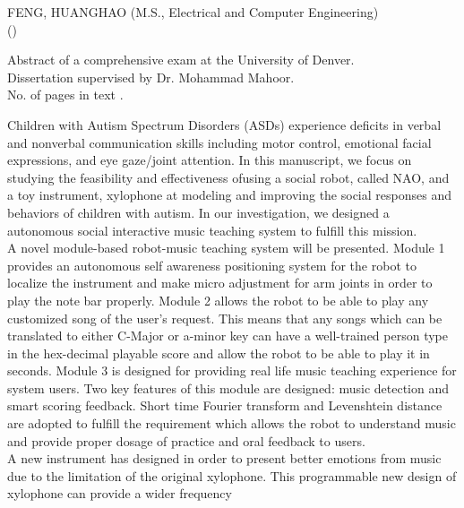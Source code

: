 \newpage
\pagestyle{empty}
\renewcommand{\baselinestretch}{1}
\begin{flushleft}
\small {
FENG, HUANGHAO  \hfill (M.S., Electrical and Computer Engineering)\\
\underline{} \hfill (\mydate)\\
\underline{}}

\vspace{0.25in}
Abstract of a comprehensive exam at the University of Denver.\\
\vspace{0.25in}
Dissertation supervised by Dr. Mohammad Mahoor.\\
No. of pages in text \underline{\pageref{LastPage}}.
\end{flushleft}
\renewcommand{\baselinestretch}{2}
\normalsize{Children with Autism Spectrum Disorders (ASDs) experience deficits in verbal and
	nonverbal communication skills including motor control, emotional facial expressions, and
	eye gaze/joint attention. In this manuscript, we focus on studying the feasibility and 
	effectiveness ofusing a social robot, called NAO, and a toy instrument, xylophone at 
	modeling and improving the social responses and	behaviors of children with autism. 
	In our investigation, we designed a autonomous social interactive music teaching 
	system to fulfill this mission. \\
	A novel module-based robot-music teaching system will be presented.
	Module 1 provides an autonomous self awareness positioning system for the robot to localize
	the instrument and make micro adjustment for arm joints in order to play the note bar properly.
	Module 2 allows the robot to be able to play any customized song of the user's request. This
	means that any songs which can be translated to either C-Major or a-minor key can have a well-trained
	person type in the hex-decimal playable score and allow the robot to be able to play it in seconds. Module 3
	is designed for providing real life music teaching experience for system users. Two key features
	of this module are designed: music detection and smart scoring feedback. Short time Fourier transform
	and Levenshtein distance are adopted to fulfill the requirement which allows the robot to understand
	music and provide proper dosage of practice and oral feedback to users.\\
	A new instrument has designed in order to present better emotions from music due to the limitation
	of the original xylophone. This programmable new design of xylophone can provide a wider frequency
}
